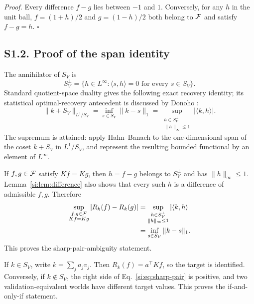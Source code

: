 \noindent\textit{Proof.}
Every difference $f-g$ lies between $-1$ and $1$. Conversely, for any $h$ in the unit ball, $f=(1+h)/2$ and $g=(1-h)/2$ both belong to $\mathcal F$ and satisfy $f-g=h$. \hfill$\square$

\subsection*{S1.2. Proof of the span identity}

The annihilator of $S_V$ is
\begin{equation}
S_V^\perp=\{h\in L^\infty:\langle s,h\rangle=0\text{ for every }s\in S_V\}.
\label{si:eq:annihilator}
\end{equation}
Standard quotient-space duality gives the following exact recovery identity; its statistical optimal-recovery antecedent is discussed by Donoho \citep[Secs.~2--3, pp.~242--259]{donoho1994}:
\begin{equation}
\|k+S_V\|_{L^1/S_V}
=\inf_{s\in S_V}\|k-s\|_1
=\sup_{\substack{h\in S_V^\perp\\\|h\|_\infty\le1}}|\langle k,h\rangle|.
\label{si:eq:quotient}
\end{equation}
The supremum is attained: apply Hahn--Banach to the one-dimensional span of the coset $k+S_V$ in $L^1/S_V$, and represent the resulting bounded functional by an element of $L^\infty$.

If $f,g\in\mathcal F$ satisfy $Kf=Kg$, then $h=f-g$ belongs to $S_V^\perp$ and has $\|h\|_\infty\le1$. Lemma~\ref{si:lem:difference} also shows that every such $h$ is a difference of admissible $f,g$. Therefore
\begin{align}
\sup_{\substack{f,g\in\mathcal F\\Kf=Kg}}
|R_k(f)-R_k(g)|
&=\sup_{\substack{h\in S_V^\perp\\\|h\|_\infty\le1}}
|\langle k,h\rangle|\nonumber\\
&=\inf_{s\in S_V}\|k-s\|_1.
\label{si:eq:sharp-pair}
\end{align}
This proves the sharp-pair-ambiguity statement.

If $k\in S_V$, write $k=\sum_ja_jv_j$. Then $R_k(f)=a^\top Kf$, so the target is identified. Conversely, if $k\notin S_V$, the right side of Eq.~\ref{si:eq:sharp-pair} is positive, and two validation-equivalent worlds have different target values. This proves the if-and-only-if statement.

